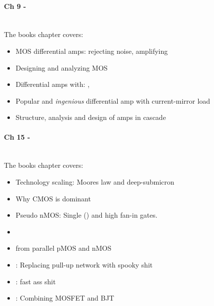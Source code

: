 \paragraph{Ch 9 - } \hfill \\
The books chapter covers:
\begin{itemize}
  \item MOS differential amps: rejecting  noise,
        amplifying 
  \item Designing and analyzing MOS 
  \item Differential amps with: , 
  \item Popular and \emph{ingenious} differential amp with current-mirror load
  \item Structure, analysis and design of  amps in cascade
\end{itemize}

\paragraph{Ch 15 - } \hfill \\
The books chapter covers:
\begin{itemize}
  \item Technology scaling: Moores law and deep-submicron
  \item Why CMOS is dominant
  \item Pseudo nMOS: Single  
        () and high fan-in gates.
  \item {}
  \item {} from parallel pMOS and nMOS
  \item {}: Replacing pull-up network with spooky shit
  \item {}: fast ass shit
  \item {}: Combining MOSFET and BJT
\end{itemize}
